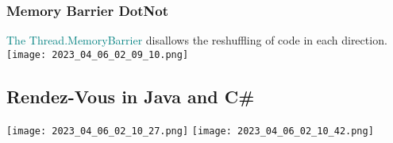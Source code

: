 \documentclass[main.tex,fontsize=8pt,paper=a4,paper=portrait,DIV=calc,]{scrartcl}
\begin{document}
\subsubsection{Memory Barrier DotNot}
\textcolor{teal}{The Thread.MemoryBarrier} disallows the reshuffling of code in each direction.\newline
\texttt{[image: 2023\_04\_06\_02\_09\_10.png]}

\subsection{Rendez-Vous in Java and C#}
\texttt{[image: 2023\_04\_06\_02\_10\_27.png]}
\texttt{[image: 2023\_04\_06\_02\_10\_42.png]}
\end{document}
